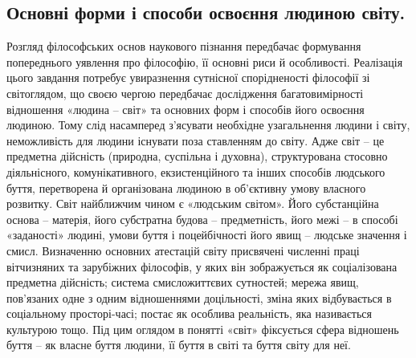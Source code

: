\subsection{Основні форми і способи освоєння людиною світу.} Розгляд
філософських основ наукового пізнання передбачає формування попереднього
уявлення про філософію, її основні риси й особливості. Реалізація цього
завдання потребує увиразнення сутнісної спорідненості філософії
зі світоглядом, що своєю чергою передбачає дослідження багатовимірності
відношення «людина – світ» та основних форм і способів його освоєння
людиною. Тому слід насамперед з’ясувати необхідне узагальнення людини і
світу, неможливість для людини існувати поза ставленням до світу. Адже світ –
це предметна дійсність (природна, суспільна і духовна), структурована
стосовно діяльнісного, комунікативного, екзистенційного та інших способів
людського буття, перетворена й організована людиною в об’єктивну умову
власного розвитку. Світ найближчим чином є «людським світом». Його
субстанційна основа – матерія, його субстратна будова – предметність, його
межі – в способі «заданості» людині, умови буття і поцейбічності його явищ –
людське значення і смисл. Визначенню основних атестацій світу присвячені
численні праці вітчизняних та зарубіжних філософів, у яких він зображується
як соціалізована предметна дійсність; система смисложиттєвих сутностей;
мережа явищ, пов’язаних одне з одним відношеннями доцільності, зміна яких
відбувається в соціальному просторі-часі; постає як особлива реальність, яка
називається культурою тощо. Під цим оглядом в понятті «світ» фіксується
сфера відношень буття – як власне буття людини, її буття в світі та буття світу
для неї.

